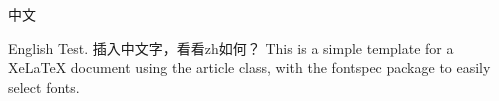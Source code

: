 \documentclass[UTF8]{ctexart}
\begin{document}
中文

English Test. 插入中文字，看看zh如何？ This is a simple template for a
XeLaTeX document using the article class, with the fontspec package to
easily select fonts.
\end{document}
